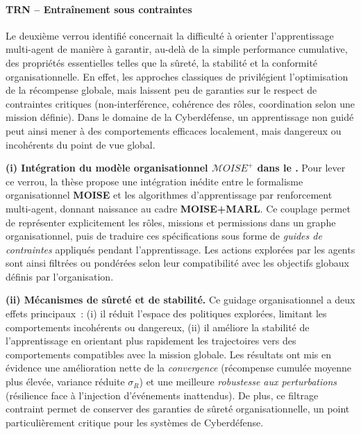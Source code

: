 \paragraph{TRN – Entraînement sous contraintes}

Le deuxième verrou identifié concernait la difficulté à orienter l'apprentissage multi-agent de manière à garantir, au-delà de la simple performance cumulative, des propriétés essentielles telles que la sûreté, la stabilité et la conformité organisationnelle.
En effet, les approches classiques de  privilégient l'optimisation de la récompense globale, mais laissent peu de garanties sur le respect de contraintes critiques (non-interférence, cohérence des rôles, coordination selon une mission définie).
Dans le domaine de la Cyberdéfense, un apprentissage non guidé peut ainsi mener à des comportements efficaces localement, mais dangereux ou incohérents du point de vue global.

\medskip
\noindent
\textbf{(i) Intégration du modèle organisationnel $\mathcal{M}OISE^+$ dans le .}
Pour lever ce verrou, la thèse propose une intégration inédite entre le formalisme organisationnel \textbf{MOISE} et les algorithmes d'apprentissage par renforcement multi-agent, donnant naissance au cadre \textbf{MOISE+MARL}.
Ce couplage permet de représenter explicitement les rôles, missions et permissions dans un graphe organisationnel, puis de traduire ces spécifications sous forme de \textit{guides de contraintes} appliqués pendant l'apprentissage.
Les actions explorées par les agents sont ainsi filtrées ou pondérées selon leur compatibilité avec les objectifs globaux définis par l'organisation.

\medskip
\noindent
\textbf{(ii) Mécanismes de sûreté et de stabilité.}
Ce guidage organisationnel a deux effets principaux~:
(i) il réduit l'espace des politiques explorées, limitant les comportements incohérents ou dangereux,
(ii) il améliore la stabilité de l'apprentissage en orientant plus rapidement les trajectoires vers des comportements compatibles avec la mission globale.
Les résultats ont mis en évidence une amélioration nette de la \textit{convergence} (récompense cumulée moyenne plus élevée, variance réduite $\sigma_R$) et une meilleure \textit{robustesse aux perturbations} (résilience face à l'injection d'événements inattendus).
De plus, ce filtrage contraint permet de conserver des garanties de sûreté organisationnelle, un point particulièrement critique pour les systèmes de Cyberdéfense.

